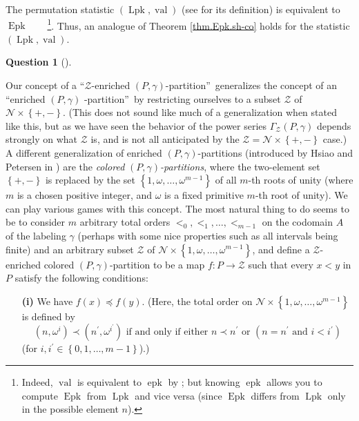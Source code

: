 \documentclass[numbers=enddot,12pt,final,onecolumn,notitlepage]{scrartcl}%
\theoremstyle{definition}
\newtheorem{quest}[theo]{Question}
\newenvironment{question}[1][]
{\begin{quest}[#1]\begin{leftbar}}
{\end{leftbar}\end{quest}}
\newenvironment{question}[1][Question]{\noindent\textbf{#1.} }{\ \rule{0.5em}{0.5em}}
\begin{document}
The permutation statistic $\left(  \operatorname*{Lpk},\operatorname*{val}%
\right)  $ (see \cite{part1} for its definition) is equivalent to
$\operatorname*{Epk}$\ \ \ \ \footnote{Indeed, $\operatorname*{val}$ is
equivalent to $\operatorname*{epk}$ by \cite[Lemma 2.1 \textbf{(e)}]{part1};
but knowing $\operatorname*{epk}$ allows you to compute $\operatorname*{Epk}$
from $\operatorname*{Lpk}$ and vice versa (since $\operatorname*{Epk}$ differs
from $\operatorname*{Lpk}$ only in the possible element $n$).}. Thus, an
analogue of Theorem \ref{thm.Epk.sh-co} holds for the statistic $\left(
\operatorname*{Lpk},\operatorname*{val}\right)  $.

\begin{question}
Our concept of a \textquotedblleft$\mathcal{Z}$-enriched $\left(
P,\gamma\right)  $-partition\textquotedblright\ generalizes the concept of an
\textquotedblleft enriched $\left(  P,\gamma\right)  $%
-partition\textquotedblright\ by restricting ourselves to a subset
$\mathcal{Z}$ of $\mathcal{N}\times\left\{  +,-\right\}  $. (This does not
sound like much of a generalization when stated like this, but as we have seen
the behavior of the power series $\Gamma_{\mathcal{Z}}\left(  P,\gamma\right)
$ depends strongly on what $\mathcal{Z}$ is, and is not all anticipated by the
$\mathcal{Z}=\mathcal{N}\times\left\{  +,-\right\}  $ case.) A different
generalization of enriched $\left(  P,\gamma\right)  $-partitions (introduced
by Hsiao and Petersen in \cite{HsiPet10}) are the \textit{colored }$\left(
P,\gamma\right)  $\textit{-partitions}, where the two-element set $\left\{
+,-\right\}  $ is replaced by the set $\left\{  1,\omega,\ldots,\omega
^{m-1}\right\}  $ of all $m$-th roots of unity (where $m$ is a chosen positive
integer, and $\omega$ is a fixed primitive $m$-th root of unity). We can play
various games with this concept. The most natural thing to do seems to be to
consider $m$ arbitrary total orders $<_{0},<_{1},\ldots,<_{m-1}$ on the
codomain $A$ of the labeling $\gamma$ (perhaps with some nice properties such
as all intervals being finite) and an arbitrary subset $\mathcal{Z}$ of
$\mathcal{N}\times\left\{  1,\omega,\ldots,\omega^{m-1}\right\}  $, and define
a $\mathcal{Z}$-enriched colored $\left(  P,\gamma\right)  $-partition to be a
map $f:P\rightarrow\mathcal{Z}$ such that every $x<y$ in $P$ satisfy the
following conditions:

\begin{enumerate}
\item[\textbf{(i)}] We have $f\left(  x\right)  \preccurlyeq f\left(
y\right)  $. (Here, the total order on $\mathcal{N}\times\left\{
1,\omega,\ldots,\omega^{m-1}\right\}  $ is defined by%
\[
\left(  n,\omega^{i}\right)  \prec\left(  n^{\prime},\omega^{i^{\prime}%
}\right)  \text{ if and only if either }n\prec n^{\prime}\text{ or }\left(
n=n^{\prime}\text{ and }i<i^{\prime}\right)
\]
(for $i,i^{\prime}\in\left\{  0,1,\ldots,m-1\right\}  $).)


\end{enumerate}
\end{question}
\end{document}
